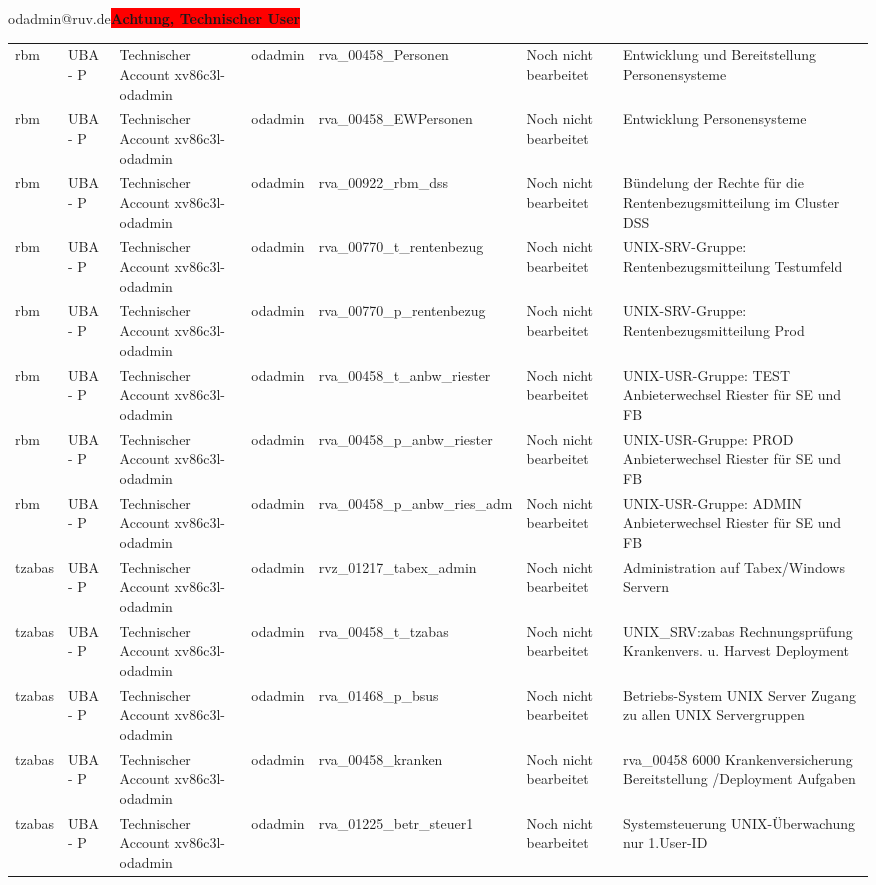 \documentclass[a4paper,landscape,12pt]{letter}
\begin{document}
\begin{letter}{odadmin@ruv.de\space\space\space\space\space\space\space\space\space\bfseries\colorbox{red}{Achtung, Technischer User}\hfill \break}
\begin{tiny}
\begin{longtable}{|p{35mm}|p{15mm}|p{25mm}|p{10mm}|p{40mm}|p{50mm}|p{50mm}|}
rbm & UBA - P & Technischer Account xv86c3l-odadmin & odadmin & rva\_00458\_Personen & Noch nicht bearbeitet & Entwicklung und Bereitstellung Personensysteme \\
rbm & UBA - P & Technischer Account xv86c3l-odadmin & odadmin & rva\_00458\_EWPersonen & Noch nicht bearbeitet & Entwicklung Personensysteme \\
rbm & UBA - P & Technischer Account xv86c3l-odadmin & odadmin & rva\_00922\_rbm\_dss & Noch nicht bearbeitet & Bündelung der Rechte für die Rentenbezugsmitteilung im Cluster DSS \\
rbm & UBA - P & Technischer Account xv86c3l-odadmin & odadmin & rva\_00770\_t\_rentenbezug & Noch nicht bearbeitet & UNIX-SRV-Gruppe: Rentenbezugsmitteilung Testumfeld \\
rbm & UBA - P & Technischer Account xv86c3l-odadmin & odadmin & rva\_00770\_p\_rentenbezug & Noch nicht bearbeitet & UNIX-SRV-Gruppe: Rentenbezugsmitteilung Prod \\
rbm & UBA - P & Technischer Account xv86c3l-odadmin & odadmin & rva\_00458\_t\_anbw\_riester & Noch nicht bearbeitet & UNIX-USR-Gruppe: TEST Anbieterwechsel Riester für SE und FB \\
rbm & UBA - P & Technischer Account xv86c3l-odadmin & odadmin & rva\_00458\_p\_anbw\_riester & Noch nicht bearbeitet & UNIX-USR-Gruppe: PROD Anbieterwechsel Riester für SE und FB \\
rbm & UBA - P & Technischer Account xv86c3l-odadmin & odadmin & rva\_00458\_p\_anbw\_ries\_adm & Noch nicht bearbeitet & UNIX-USR-Gruppe: ADMIN Anbieterwechsel Riester für SE und FB \\
tzabas & UBA - P & Technischer Account xv86c3l-odadmin & odadmin & rvz\_01217\_tabex\_admin & Noch nicht bearbeitet & Administration auf Tabex/Windows Servern \\
tzabas & UBA - P & Technischer Account xv86c3l-odadmin & odadmin & rva\_00458\_t\_tzabas & Noch nicht bearbeitet & UNIX\_SRV:zabas Rechnungsprüfung Krankenvers. u. Harvest Deployment \\
tzabas & UBA - P & Technischer Account xv86c3l-odadmin & odadmin & rva\_01468\_p\_bsus & Noch nicht bearbeitet & Betriebs-System UNIX Server Zugang zu allen UNIX Servergruppen \\
tzabas & UBA - P & Technischer Account xv86c3l-odadmin & odadmin & rva\_00458\_kranken & Noch nicht bearbeitet & rva\_00458 6000 Krankenversicherung Bereitstellung /Deployment Aufgaben \\
tzabas & UBA - P & Technischer Account xv86c3l-odadmin & odadmin & rva\_01225\_betr\_steuer1 & Noch nicht bearbeitet & Systemsteuerung UNIX-Überwachung nur 1.User-ID \\

\end{longtable}
\end{tiny}
\end{letter}
\end{document}
